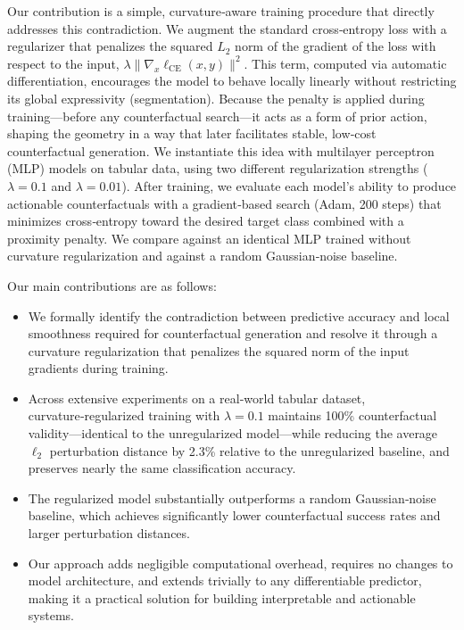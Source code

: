 \documentclass[11pt,a4paper]{article}
\begin{document}
Our contribution is a simple, curvature‑aware training procedure that directly addresses this contradiction.
We augment the standard cross‑entropy loss with a regularizer that penalizes the squared \(L_2\) norm of the gradient of the loss with respect to the input, \(\lambda\|\nabla_x \ell_{\mathrm{CE}}(x,y)\|^2\).
This term, computed via automatic differentiation, encourages the model to behave locally linearly without restricting its global expressivity (segmentation).
Because the penalty is applied during training---before any counterfactual search---it acts as a form of prior action, shaping the geometry in a way that later facilitates stable, low‑cost counterfactual generation.
We instantiate this idea with multilayer perceptron (MLP) models on tabular data, using two different regularization strengths (\(\lambda = 0.1\) and \(\lambda = 0.01\)).
After training, we evaluate each model’s ability to produce actionable counterfactuals with a gradient‑based search (Adam, 200 steps) that minimizes cross‑entropy toward the desired target class combined with a proximity penalty.
We compare against an identical MLP trained without curvature regularization and against a random Gaussian‑noise baseline.

Our main contributions are as follows:
\begin{itemize}
\item We formally identify the contradiction between predictive accuracy and local smoothness required for counterfactual generation and resolve it through a curvature regularization that penalizes the squared norm of the input gradients during training.
\item Across extensive experiments on a real‑world tabular dataset, curvature‑regularized training with \(\lambda = 0.1\) maintains 100\% counterfactual validity---identical to the unregularized model---while reducing the average \(\ell_2\) perturbation distance by 2.3\% relative to the unregularized baseline, and preserves nearly the same classification accuracy.
\item The regularized model substantially outperforms a random Gaussian‑noise baseline, which achieves significantly lower counterfactual success rates and larger perturbation distances.
\item Our approach adds negligible computational overhead, requires no changes to model architecture, and extends trivially to any differentiable predictor, making it a practical solution for building interpretable and actionable systems.
\end{itemize}
\end{document}

